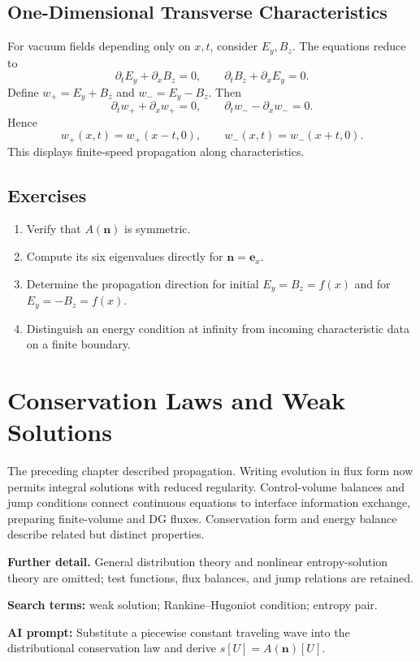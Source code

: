 \documentclass[11pt,openany]{book}
\numberwithin{equation}{chapter}
\theoremstyle{definition}
\theoremstyle{remark}
\newcommand{\studyroute}[3]{%
  \par\smallskip\noindent\textbf{Further detail.} #1\par
  \begingroup\raggedright\noindent\textbf{Search terms:} #2.\par\endgroup
  \noindent\textbf{AI prompt:} #3\par
}
\begin{document}
\section{One-Dimensional Transverse Characteristics}
For vacuum fields depending only on $x,t$, consider $E_y,B_z$. The equations reduce to
\begin{equation}\label{eq:1dwave}
\partial_tE_y+\partial_xB_z=0,
\qquad \partial_tB_z+\partial_xE_y=0.
\end{equation}
Define $w_+=E_y+B_z$ and $w_-=E_y-B_z$. Then
\begin{equation}
\partial_tw_++\partial_xw_+=0,
\qquad
\partial_tw_- -\partial_xw_-=0.
\end{equation}
Hence
\begin{equation}
w_+(x,t)=w_+(x-t,0),\qquad
w_-(x,t)=w_-(x+t,0).
\end{equation}
This displays finite-speed propagation along characteristics.

\section{Exercises}
\begin{enumerate}
\item Verify that $A(\bm n)$ is symmetric.
\item Compute its six eigenvalues directly for $\bm n=\bm e_x$.
\item Determine the propagation direction for initial $E_y=B_z=f(x)$ and for $E_y=-B_z=f(x)$.
\item Distinguish an energy condition at infinity from incoming characteristic data on a finite boundary.
\end{enumerate}

\chapter{Conservation Laws and Weak Solutions}
\label{ch:conservation}
\begin{chaptersummary}
The preceding chapter described propagation. Writing evolution in flux form now permits integral solutions with reduced regularity. Control-volume balances and jump conditions connect continuous equations to interface information exchange, preparing finite-volume and DG fluxes. Conservation form and energy balance describe related but distinct properties.
\end{chaptersummary}
\studyroute{General distribution theory and nonlinear entropy-solution theory are omitted; test functions, flux balances, and jump relations are retained.}{weak solution; Rankine--Hugoniot condition; entropy pair}{Substitute a piecewise constant traveling wave into the distributional conservation law and derive $s[U]=A(\bm n)[U]$.}
\end{document}
